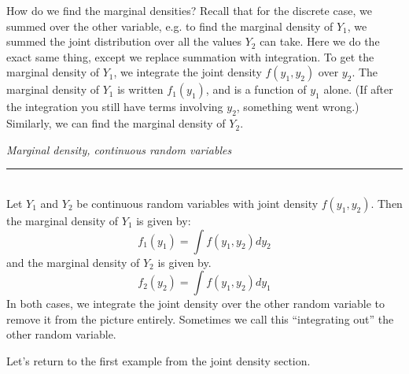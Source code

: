 \documentclass[12pt]{article}
\theoremstyle{definition}
\theoremstyle{remark}
\begin{document}
How do we find the marginal densities? Recall that for the discrete case, we summed over the other variable, e.g. to find the marginal density of $Y_1$, we summed the joint distribution over all the values $Y_2$ can take. Here we do the exact same thing, except we replace summation with integration. To get the marginal density of $Y_1$, we integrate the joint density $f(y_1, y_2)$ over $y_2$. The marginal density of $Y_1$ is written $f_1(y_1)$, and is a function of $y_1$ alone. (If after the integration you still have terms involving $y_2$, something went wrong.) Similarly, we can find the marginal density of $Y_2$.

\begin{framed}

\emph{Marginal density, continuous random variables}\\
  \rule{\dimexpr{}\fboxrule}{.1pt} \\
Let $Y_1$ and $Y_2$ be continuous random variables with joint density $f(y_1, y_2)$. Then the marginal density of $Y_1$ is given by:
\[
f_1(y_1) = \int f(y_1, y_2) dy_2
\]
and the marginal density of $Y_2$ is given by.
\[
f_2(y_2) = \int f(y_1, y_2) dy_1
\]
In both cases, we integrate the joint density over the other random variable to remove it from the picture entirely. Sometimes we call this ``integrating out'' the other random variable.
\end{framed}

Let's return to the first example from the joint density section.
\end{document}
